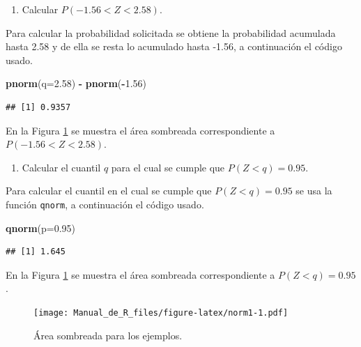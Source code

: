 \documentclass[10pt,]{krantz}
\makeatletter
\newenvironment{Shaded}{\begin{snugshade}}{\end{snugshade}}
\newcommand{\KeywordTok}[1]{\textcolor[rgb]{0.13,0.29,0.53}{\textbf{#1}}}
\newcommand{\DataTypeTok}[1]{\textcolor[rgb]{0.13,0.29,0.53}{#1}}
\newcommand{\FloatTok}[1]{\textcolor[rgb]{0.00,0.00,0.81}{#1}}
\newcommand{\StringTok}[1]{\textcolor[rgb]{0.31,0.60,0.02}{#1}}
\newcommand{\OperatorTok}[1]{\textcolor[rgb]{0.81,0.36,0.00}{\textbf{#1}}}
\newcommand{\NormalTok}[1]{#1}
\providecommand{\tightlist}{%
  \setlength{\itemsep}{0pt}\setlength{\parskip}{0pt}}
\newenvironment{kframe}{%
\medskip{}
\setlength{\fboxsep}{.8em}
 \def\at@end@of@kframe{}%
 \ifinner\ifhmode%
  \def\at@end@of@kframe{\end{minipage}}%
  \begin{minipage}{\columnwidth}%
 \fi\fi%
 \def\FrameCommand##1{\hskip\@totalleftmargin \hskip-\fboxsep
 \colorbox{shadecolor}{##1}\hskip-\fboxsep
     \hskip-\linewidth \hskip-\@totalleftmargin \hskip\columnwidth}%
 \MakeFramed {\advance\hsize-\width
   \@totalleftmargin\z@ \linewidth\hsize
   \@setminipage}}%
 {\par\unskip\endMakeFramed%
 \at@end@of@kframe}
\renewenvironment{Shaded}{\begin{kframe}}{\end{kframe}}
\makeatother
\begin{document}
\begin{enumerate}
\def\labelenumi{\arabic{enumi})}
\setcounter{enumi}{2}
\tightlist
\item
  Calcular \(P(-1.56 < Z < 2.58)\).
\end{enumerate}

Para calcular la probabilidad solicitada se obtiene la probabilidad
acumulada hasta 2.58 y de ella se resta lo acumulado hasta -1.56, a
continuación el código usado.

\begin{Shaded}
\begin{Highlighting}[]
\KeywordTok{pnorm}\NormalTok{(}\DataTypeTok{q=}\FloatTok{2.58}\NormalTok{) }\OperatorTok{-}\StringTok{ }\KeywordTok{pnorm}\NormalTok{(}\OperatorTok{-}\FloatTok{1.56}\NormalTok{)}
\end{Highlighting}
\end{Shaded}

\begin{verbatim}
## [1] 0.9357
\end{verbatim}

En la Figura \ref{fig:norm1} se muestra el área sombreada
correspondiente a \(P(-1.56 < Z < 2.58)\).

\begin{enumerate}
\def\labelenumi{\arabic{enumi})}
\setcounter{enumi}{3}
\tightlist
\item
  Calcular el cuantil \(q\) para el cual se cumple que \(P(Z<q)=0.95\).
\end{enumerate}

Para calcular el cuantil en el cual se cumple que \(P(Z<q)=0.95\) se usa
la función \texttt{qnorm}, a continuación el código usado.

\begin{Shaded}
\begin{Highlighting}[]
\KeywordTok{qnorm}\NormalTok{(}\DataTypeTok{p=}\FloatTok{0.95}\NormalTok{) }
\end{Highlighting}
\end{Shaded}

\begin{verbatim}
## [1] 1.645
\end{verbatim}

En la Figura \ref{fig:norm1} se muestra el área sombreada
correspondiente a \(P(Z<q)=0.95\).

\begin{figure}
\centering
\texttt{[image: Manual\_de\_R\_files/figure-latex/norm1-1.pdf]}
\caption{\label{fig:norm1}Área sombreada para los ejemplos.}
\end{figure}
\end{document}
